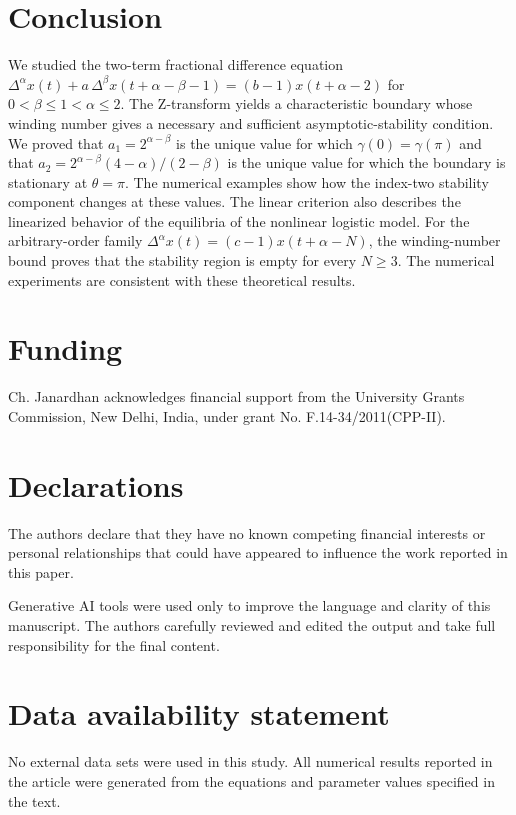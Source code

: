 \documentclass[11pt,a4paper]{article}
\theoremstyle{definition}
\begin{document}
\section{Conclusion} \label{con.}
We studied the two-term fractional difference equation $\Delta^{\alpha}x(t) + a\,\Delta^{\beta}x(t + \alpha - \beta - 1) = (b - 1)x(t + \alpha - 2)$ for $0 < \beta \leq 1 < \alpha \leq 2$. The Z-transform yields a characteristic boundary whose winding number gives a necessary and sufficient asymptotic-stability condition. We proved that $a_1=2^{\alpha-\beta}$ is the unique value for which $\gamma(0)=\gamma(\pi)$ and that $a_2=2^{\alpha-\beta}(4-\alpha)/(2-\beta)$ is the unique value for which the boundary is stationary at $\theta=\pi$. The numerical examples show how the index-two stability component changes at these values. The linear criterion also describes the linearized behavior of the equilibria of the nonlinear logistic model. For the arbitrary-order family $\Delta^{\alpha}x(t) = (c - 1)x(t + \alpha - N)$, the winding-number bound proves that the stability region is empty for every $N\geq3$. The numerical experiments are consistent with these theoretical results.
\section*{Funding}
Ch. Janardhan acknowledges financial support from the University Grants Commission, New Delhi, India, under grant No. F.14-34/2011(CPP-II).

\section*{Declarations}
The authors declare that they have no known competing financial interests or personal relationships that could have appeared to influence the work reported in this paper.

Generative AI tools were used only to improve the language and clarity of this manuscript. The authors carefully reviewed and edited the output and take full responsibility for the final content.


\section*{Data availability statement}
No external data sets were used in this study. All numerical results reported in the article were generated from the equations and parameter values specified in the text.
 


\end{document}
